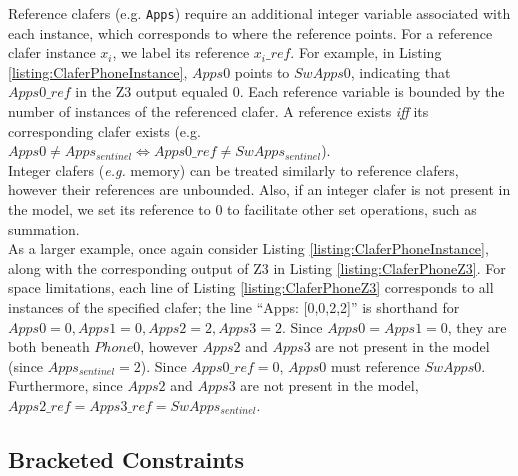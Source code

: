 \documentclass{easychair}
\newcommand{\eg}{\emph{e.g.}\xspace}
\begin{document}
\indent Reference clafers (e.g. \texttt{Apps}) require an additional integer variable associated with each instance, which corresponds to where the reference points. For a reference clafer instance $x_i$, we label its reference $x_i\_ref$. For example, in Listing \ref{listing:ClaferPhoneInstance}, $Apps0$ points to $SwApps0$, indicating that $Apps0\_ref$ in the Z3 output equaled 0. Each reference variable is bounded by the number of instances of the referenced clafer. A reference exists \textit{iff} its corresponding clafer exists (e.g. $Apps0 \ne Apps_{sentinel} \Leftrightarrow Apps0\_ref \ne SwApps_{sentinel}$). \\
\indent Integer clafers (\eg memory) can be treated similarly to reference clafers, however their references are unbounded. Also, if an integer clafer is not present in the model, we set its reference to 0 to facilitate other set operations, such as summation. \\
\indent As a larger example, once again consider Listing \ref{listing:ClaferPhoneInstance}, along with the corresponding output of Z3 in Listing \ref{listing:ClaferPhoneZ3}. For space limitations, each line of Listing \ref{listing:ClaferPhoneZ3} corresponds to all instances of the specified clafer; the line ``Apps: [0,0,2,2]'' is shorthand for $Apps0 = 0, Apps1 = 0, Apps2 = 2, Apps3 = 2$. Since $Apps0 = Apps1 = 0$, they are both beneath $Phone0$, however $Apps2$ and $Apps3$ are not present in the model (since $Apps_{sentinel} = 2$). Since $Apps0\_ref = 0$, $Apps0$ must reference $SwApps0$. Furthermore, since $Apps2$ and $Apps3$ are not present in the model, $Apps2\_ref = Apps3\_ref = SwApps_{sentinel}$.


\subsection{Bracketed Constraints}
\end{document}
